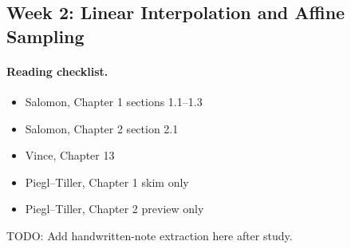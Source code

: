 \subsection{Week 2: Linear Interpolation and Affine Sampling}

\paragraph{Reading checklist.}
\begin{itemize}
  \item Salomon, Chapter 1 sections 1.1--1.3
  \item Salomon, Chapter 2 section 2.1
  \item Vince, Chapter 13
  \item Piegl--Tiller, Chapter 1 skim only
  \item Piegl--Tiller, Chapter 2 preview only
\end{itemize}

\begin{remark*}
\begingroup\small
{}
\endgroup
\end{remark*}

\begin{remark*}
TODO: Add handwritten-note extraction here after study.
\end{remark*}
